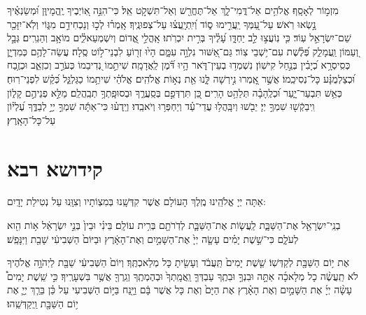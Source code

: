 \documentclass[twoside, openany, parskip=half, 11pt]{book}
\begin{document}
  מִזְמ֣וֹר לְאָסָֽף׃
  אֱלֹהִ֥ים אַל־דֳּמִי־לָ֑ךְ אַל־תֶּחֱרַ֖שׁ וְאַל־תִּשְׁקֹ֣ט אֵֽל׃ כִּי־הִנֵּ֣ה אֽ֭וֹיְבֶיךָ יֶֽהֱמָיוּ֑ן וּ֝מְשַׂנְאֶ֗יךָ נָ֣שְׂאוּ רֹֽאשׁ׃ עַל־עַ֭מְּךָ יַֽעֲרִ֣ימוּ ס֑וֹד וְ֝יִֽתְיָֽעֲצ֗וּ עַל־צְפוּנֶֽיךָ׃ אָֽמְר֗וּ לְכ֣וּ וְנַכְחִידֵ֣ם מִגּ֑וֹי וְלֹֽא־יִזָּכֵ֖ר שֵׁם־יִשְׂרָאֵ֣ל עֽוֹד׃ כִּ֤י נֽוֹעֲצ֣וּ לֵ֣ב יַחְדָּ֑ו עָ֝לֶ֗יךָ בְּרִ֣ית יִכְרֹֽתוּ׃ אָֽהֳלֵ֣י אֱ֭דוֹם וְיִשְׁמְעֵאלִ֑֗ים מוֹאָ֥ב וְהַגְרִֽים׃ גְּבָ֣ל וְ֭עַמּוֹן וַֽעֲמָלֵ֑ק פְּ֝לֶ֗שֶׁת עִם־י֥שְׁבֵי צֽוֹר׃ גַּם־אַ֭שּׁוּר נִלְוָ֣ה עִמָּ֑ם הָי֙וּ זְר֖וֹעַ לִבְנֵי־ל֣וֹט סֶֽלָה׃ עֲשֵׂה־לָהֶ֥ם כְּמִדְיָ֑ן כְּסִֽיסְרָ֥א כְ֝יָבִ֗ין בְּנַ֣חַל קִישֽׁוֹן׃ נִשְׁמְד֥וּ בְעֵין־דֹּ֑אר הָ֥יוּ דֹּ֝֗מֶן לַֽאֲדָמָֽה׃ שִׁיתֵ֣מוֹ נְ֭דִיבֵמוֹ כְּעֹרֵ֣ב וְכִזְאֵ֑ב וּכְזֶ֥בַח וּ֝כְצַלְמֻנָּ֗ע כָּל־נְסִיכֵֽמוֹ׃ אֲשֶׁ֣ר אָֽ֭מְרוּ נִ֣ירְשָׁה לָּ֑נוּ אֵ֖ת נְא֣וֹת אֱלֹהִֽים׃ אֱלֹהַ֗י שִׁיתֵ֥מוֹ כַגַּלְגַּ֑ל כְּ֝קַ֗שׁ לִפְנֵי־רֽוּחַ׃ כְּאֵ֥שׁ תִּבְעַר־יָ֑עַר וּ֝כְלֶֽהָבָ֗ה תְּלַהֵ֥ט הָרִֽים׃  כֵּ֭ן תִּרְדְּפֵ֣ם בְּסַֽעֲרֶ֑ךָ וּבְסוּפָֽתְךָ֥ תְבַֽהֲלֵֽם׃ מַלֵּ֣א פְנֵיהֶ֣ם קָל֑וֹן וִֽיבַקְֿשׁ֖וּ שִׁמְךָ֣ יְיָ׃ יֵבֹ֖שׁוּ וְיִבָּֽהֲל֥וּ עֲדֵי־עַ֗ד וְיַחְפְּר֥וּ וְיֹאבֵֽדוּ׃ וְיֵֽדְע֗וּ כִּי־אַתָּ֬ה שִׁמְךָ֣ יְיָ֣ לְבַדֶּ֑ךָ עֶ֝לְי֗וֹן עַל־כָּל־הָאָֽרֶץ׃

\mournerskaddish

\birkashabonim

\vfill

\quad{}\quad{}

\chapter[קידושא רבא]{ קידושא רבא }




 אַתָּה יְיָ אֱלֹהֵֽינוּ מֶֽלֶךְ הָעוֹלָם אֲשֶׁר קִדְּשָֽׁנוּ בְּמִצְוֹתָיו וְצִוָּֽנוּ עַל נְטִילַת יָדָֽיִם: 


  
  בְנֵֽי־יִשְׂרָאֵ֖ל אֶת־הַשַּׁבָּ֑ת לַֽעֲשׂ֧וֹת אֶת־הַשַּׁבָּ֛ת לְדֹֽרֹתָ֖ם בְּרִ֥ית עוֹלָֽם׃ בֵּינִ֗י וּבֵין֙ בְּנֵ֣י יִשְׂרָאֵ֔ל א֥וֹת הִ֖וא לְעֹלָ֑ם כִּי־שֵׁ֣שֶׁת יָמִ֗ים עָשָׂ֤ה יְיָ֙ אֶת־הַשָּׁמַ֣יִם וְאֶת־הָאָ֔רֶץ וּבַיּוֹם֙ הַשְּׁבִיעִ֔י שָׁבַ֖ת וַיִּנָּפַֽשׁ׃


 
 אֶת י֥וֹם הַשַּׁבָּ֖ת לְקַדְּשֽׁוֹ׃ שֵׁ֤שֶׁת יָמִים֙ תַּֽעֲבֹ֔ד וְעָשִׂ֖יתָ כָּל מְלַאכְתֶּֽךָ׃ וְיוֹם֙ הַשְּׁבִיעִ֔י שַׁבָּ֖ת לַיֽהֹוָ֣ה אֱלֹהֶיךָ לֹא תַֽעֲשֶׂ֨ה כָל מְלָאכָ֜ה אַתָּ֣ה וּבִנְךָ֣ וּבִתֶֽךָ עַבְדְּךָ֤ וַֽאֲמָֽתְךָ֙ וּבְהֶמְתֶֽךָ וְגֵֽרְךָ֖ אֲשֶׁ֥ר בִּשְׁעָרֶֽיךָ׃ כִּ֣י שֵֽׁשֶׁת יָמִים֩ עָשָׂ֨ה יְיָ֜ אֶת הַשָּׁמַ֣יִם וְאֶת הָאָ֗רֶץ אֶת הַיָּם֙ וְאֶת כָּל אֲשֶׁר בָּ֔ם וַיָּ֖נַח בַּיּ֣וֹם הַשְּׁבִיעִי עַל כֵּ֗ן בֵּרַ֧ךְ יְיָ֛ אֶת י֥וֹם הַשַּׁבָּ֖ת וַֽיְקַדְּשֵֽׁהוּ׃
\end{document}
